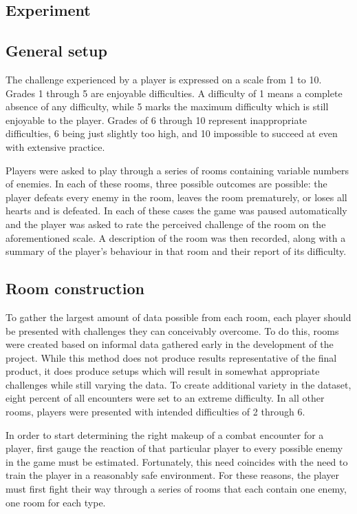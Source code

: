 \documentclass[a4paper]{article}
\begin{document}
\begin{multicols*}{2}
\section{Experiment}
\subsection{General setup}
The challenge experienced by a player is expressed on a scale from 1 to 10. Grades 1 through 5 are enjoyable difficulties. A difficulty of 1 means a complete absence of any difficulty, while 5 marks the maximum difficulty which is still enjoyable to the player. Grades of 6 through 10 represent inappropriate difficulties, 6 being just slightly too high, and 10 impossible to succeed at even with extensive practice.

Players were asked to play through a series of rooms containing variable numbers of enemies. In each of these rooms, three possible outcomes are possible: the player  defeats every enemy in the room, leaves the room prematurely, or loses all hearts and is defeated. In each of these cases the game was paused automatically and the player was asked to rate the perceived challenge of the room on the aforementioned scale. A description of the room was then recorded, along with a summary of the player's behaviour in that room and their report of its difficulty.

\subsection{Room construction}
To gather the largest amount of data possible from each room, each player should be presented with challenges they can conceivably overcome. To do this, rooms were created based on informal data gathered early in the development of the project. While this method does not produce results representative of the final product, it does produce setups which will result in somewhat appropriate challenges while still varying the data. To create additional variety in the dataset, eight percent of all encounters were set to an extreme difficulty. In all other rooms, players were presented with intended difficulties of 2 through 6.

In order to start determining the right makeup of a combat encounter for a player, first gauge the reaction of that particular player to every possible enemy in the game must be estimated. Fortunately, this need coincides with the need to train the player in a reasonably safe environment. For these reasons, the player must first fight their way through a series of rooms that each contain one enemy, one room for each type. 


\end{multicols*}
\end{document}
